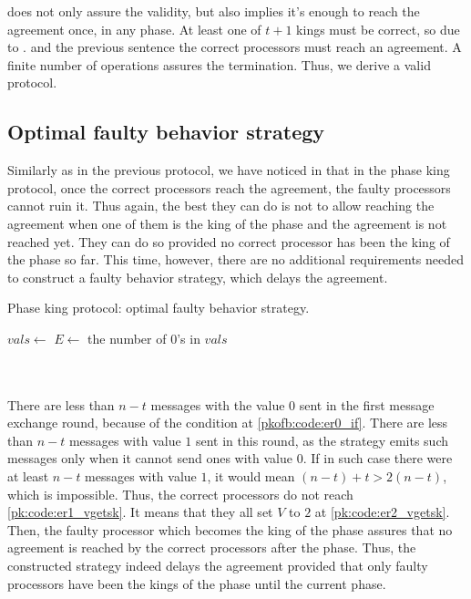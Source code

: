  does not only assure the validity, but also implies it's enough to reach the agreement once, in any phase. At least one of $t+1$ kings must be correct, so due to . and the previous sentence the correct processors must reach an agreement. A finite number of operations assures the termination. Thus, we derive a valid protocol.

\subsection{Optimal faulty behavior strategy}
Similarly as in the previous protocol, we have noticed in  that in the phase king protocol, once the correct processors reach the agreement, the faulty processors cannot ruin it. Thus again, the best they can do is not to allow reaching the agreement when one of them is the king of the phase and the agreement is not reached yet. They can do so provided no correct processor has been the king of the phase so far. This time, however, there are no additional requirements needed to construct a faulty behavior strategy, which delays the agreement.

\begin{breakablealgorithm}
  \caption{Phase king protocol: optimal faulty behavior strategy.}
  \begin{algorithmic}[1]
        \State $vals \gets$ 
        \State $E \gets$ the number of $0$'s in $vals$
         \label{pkofb:code:er0_if}
            \State {}
        \Else
            \State {}
        \EndIf
        \\
        \State {}
        \State {}
        \\
        \State {}
                \State {}
            \EndFor
                \State {}
            \EndFor
        \EndIf
        \\
        \State {}
    \EndFor
  \end{algorithmic}
\end{breakablealgorithm}

There are less than $n-t$ messages with the value $0$ sent in the first message exchange round, because of the condition at \cref{pkofb:code:er0_if}. There are less than $n-t$ messages with value $1$ sent in this round, as the strategy emits such messages only when it cannot send ones with value $0$. If in such case there were at least $n-t$ messages with value $1$, it would mean $(n-t) + t > 2(n-t)$, which is impossible. Thus, the correct processors do not reach \cref{pk:code:er1_vgetsk}. It means that they all set $V$ to $2$ at \cref{pk:code:er2_vgetsk}. Then, the faulty processor which becomes the king of the phase assures that no agreement is reached by the correct processors after the phase. Thus, the constructed strategy indeed delays the agreement provided that only faulty processors have been the kings of the phase until the current phase.


